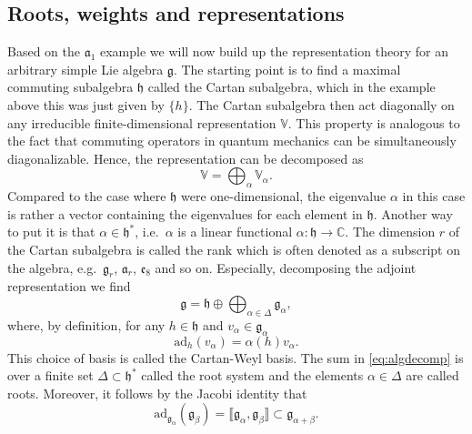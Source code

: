 \subsection{Roots, weights and representations}
Based on the $\mathfrak{a}_1$ example we will now build up the representation theory for an arbitrary simple Lie algebra $\mathfrak{g}$. The starting point is to find a maximal commuting subalgebra $\mathfrak{h}$ called the Cartan subalgebra, which in the example above this was just given by $\{h\}$. The Cartan subalgebra then act diagonally on any irreducible finite-dimensional representation $\mathbb{V}$. This property is analogous to the fact that commuting operators in quantum mechanics can be simultaneously diagonalizable. Hence, the representation can be decomposed as 
\begin{equation}
    \mathbb{V} = \bigoplus_\alpha \mathbb{V}_\alpha.
\end{equation}
Compared to the case where $\mathfrak{h}$ were one-dimensional, the eigenvalue $\alpha$ in this case is rather a vector containing the eigenvalues for each element in $\mathfrak{h}$. Another way to put it is that $\alpha\in \mathfrak{h}^*$, i.e.\ $\alpha$ is a linear functional $\alpha:\mathfrak{h}\to \mathbb{C}$. The dimension $r$ of the Cartan subalgebra is called the rank which is often denoted as a subscript on the algebra, e.g.\ $\mathfrak{g}_r$, $\mathfrak{a}_r$, $\mathfrak{e}_8$ and so on. Especially, decomposing the adjoint representation we find
\begin{equation}\label{eq:algdecomp}
    \mathfrak{g} = \mathfrak{h}\oplus\bigoplus_{\alpha\in\Delta} \mathfrak{g}_\alpha,
\end{equation}
where, by definition, for any $h\in\mathfrak{h}$ and $v_\alpha\in\mathfrak{g}_\alpha$ 
\begin{equation}
    \text{ad}_h(v_\alpha) = \alpha(h)v_\alpha.
\end{equation}
This choice of basis is called the Cartan-Weyl basis. The sum in \eqref{eq:algdecomp} is over a finite set $\Delta\subset\mathfrak{h}^*$ called the root system and the elements $\alpha\in\Delta$ are called roots. Moreover, it follows by the Jacobi identity that 
\begin{equation}
    \text{ad}_{\mathfrak{g}_\alpha}(\mathfrak{g}_\beta) = \llbracket\mathfrak{g}_\alpha,\mathfrak{g}_\beta\rrbracket \subset \mathfrak{g}_{\alpha+\beta}.
\end{equation}
